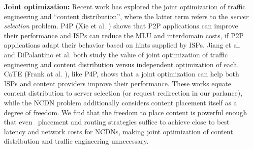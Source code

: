 \textbf{Joint optimization:} Recent work has explored the joint optimization of traffic engineering and ``content distribution'', where the latter term refers to the {\em server selection} problem. P4P (Xie et al.  \cite{P4P}) shows that P2P applications can improve their performance and ISPs can reduce the MLU and interdomain costs, if P2P applications adapt their behavior based on hints supplied by ISPs. Jiang et al.  \cite{Jiang2009} and  DiPalantino et al. \cite{JohariGameTheory} both study the value of joint optimization of traffic engineering and content distribution versus   independent optimization of each. CaTE (Frank at al. \cite{catenew}),  like P4P, shows that a joint optimization can help both ISPs and content providers improve their performance. These works equate content distribution to server selection (or request redirection in our parlance), while the NCDN problem additionally considers content placement itself as a degree of freedom. 
We find that the freedom to place content is powerful enough that even \unplanned\ placement and routing strategies suffice to achieve close to best latency and network costs for NCDNs, making joint optimization of content distribution and traffic engineering unnecessary.











